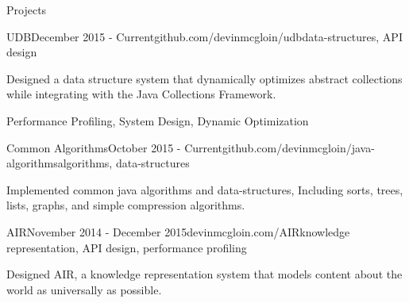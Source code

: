 \documentclass{resume} %
\begin{document}
\begin{rSection}{Projects}


\begin{rSubsection}{UDB}{December 2015 -  Current}{github.com/devinmcgloin/udb}{data-structures, API design}
\item Designed a data structure system that dynamically optimizes abstract collections while integrating with the Java Collections Framework. 
\item Performance Profiling, System Design, Dynamic Optimization
\end{rSubsection}


\begin{rSubsection}{Common Algorithms}{October 2015 -  Current}{github.com/devinmcgloin/java-algorithms}{algorithms, data-structures}
\item Implemented common java algorithms and data-structures, Including sorts, trees, lists, graphs, and simple compression algorithms.
\end{rSubsection}





\begin{rSubsection}{AIR}{November 2014 -  December 2015}{devinmcgloin.com/AIR}{knowledge representation, API design, performance profiling}
\item Designed AIR, a knowledge representation system that models content about the world as universally as possible. 
\item 

\end{rSubsection}
\end{rSection}
\end{document}
